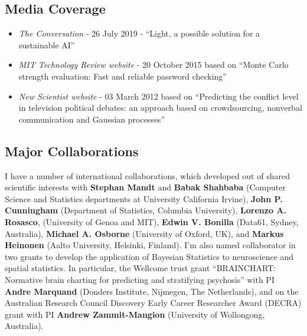 \documentclass[oneside, a4paper, onecolumn, 10pt]{article}
\newcommand{\myacro}[0]{\name{prism}}
\begin{document}
\subsection*{Media Coverage}



\begin{itemize}
\item {\em The Conversation} - 26 July 2019 - ``Light, a possible solution for a sustainable AI''
\item {\em MIT Technology Review website} - 20 October 2015 based on ``Monte Carlo strength evaluation: Fast and reliable password checking''
\item {\em New Scientist website} - 03 March 2012 based on ``Predicting the conflict level in television political debates: an approach based on crowdsourcing, nonverbal communication and Gaussian processes''
\end{itemize}

\subsection*{Major Collaborations}

I have a number of international collaborations, which developed out of shared scientific interests with {\bf Stephan Mandt} and {\bf Babak Shahbaba} (Computer Science and Statistics departments at University California Irvine), {\bf John P. Cunningham} (Department of Statistics, Columbia University), {\bf Lorenzo A. Rosasco}, (University of Genoa and MIT), {\bf Edwin V. Bonilla} (Data61, Sydney, Australia), {\bf Michael A. Osborne} (University of Oxford, UK), and {\bf Markus Heinonen} (Aalto University, Helsinki, Finland).
I'm also named collaborator in two grants to develop the application of Bayesian Statistics to neuroscience and spatial statistics. 
In particular, the Wellcome trust grant ``BRAINCHART: Normative brain charting for predicting and stratifying psychosis'' with PI {\bf Andre Marquand} (Donders Institute, Nijmegen, The Netherlands), and on the Australian Research Council Discovery Early Career Researcher Award (DECRA) grant with PI {\bf Andrew Zammit-Mangion} (University of Wollongong, Australia).
\end{document}
